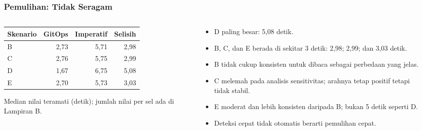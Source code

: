 {
\usebackgroundtemplate{\backgroundcontent}
\begin{frame}
    \frametitle{Pemulihan: Tidak Seragam}
    \begin{columns}[T]
        \begin{column}{0.48\textwidth}
            \centering
            \scriptsize
            \begin{tabular}{@{}lrrr@{}}
                \toprule
                \textbf{Skenario} & \textbf{GitOps} & \textbf{Imperatif} & \textbf{Selisih} \\
                \midrule
                B & 2,73 & 5,71 & 2,98 \\
                C & 2,76 & 5,75 & 2,99 \\
                D & 1,67 & 6,75 & 5,08 \\
                E & 2,70 & 5,73 & 3,03 \\
                \bottomrule
            \end{tabular}
            \par\vspace{0.08cm}
            \raggedleft Median nilai teramati (detik); jumlah nilai per sel ada di Lampiran B.
        \end{column}
        \begin{column}{0.48\textwidth}
            \scriptsize
            \begin{itemize}\setlength{\itemsep}{4pt}
                \item D paling besar: 5,08 detik.
                \item B, C, dan E berada di sekitar 3 detik: 2,98; 2,99; dan 3,03 detik.
                \item B tidak cukup konsisten untuk dibaca sebagai perbedaan yang jelas.
                \item C melemah pada analisis sensitivitas; arahnya tetap positif tetapi tidak stabil.
                \item E moderat dan lebih konsisten daripada B; bukan 5 detik seperti D.
                \item Deteksi cepat tidak otomatis berarti pemulihan cepat.
            \end{itemize}
        \end{column}
    \end{columns}
    \vspace{0.06cm}
\end{frame}
}

